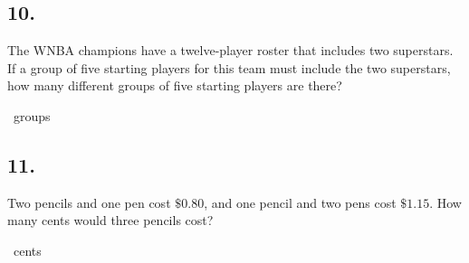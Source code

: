 \documentclass[12pt]{article}
\newenvironment{answer}{\vspace{1em}}{}
\newenvironment{answer}{\vspace{0em}\expandafter\comment}{\expandafter\endcomment}
\newlength{\currentparskip}
\newlength{\currentparindent}
\newenvironment{minipagex}[2][]
  {\setlength{\currentparskip}{\parskip}%
    \setlength{\currentparindent}{\parindent}%
   \begin{minipage}[#1]{#2}%
   \setlength{\parskip}{\currentparskip}%
   \setlength{\parindent}{\currentparindent}%
  }
  {\end{minipage}}
\begin{document}
\subsection*{10.}
The WNBA champions have a twelve-player roster that includes two superstars. If a group of five starting players for this team must include the two superstars, how many different groups of five starting players are there?

\fbox{\phantom{ANSWER}}~groups

\begin{answer}
%
\end{answer}


\subsection*{11.}
Two pencils and one pen cost $\$0.80$, and one pencil and two pens cost $\$1.15$. How many cents would three pencils cost?

\fbox{\phantom{ANSWER}}~cents
\end{document}
